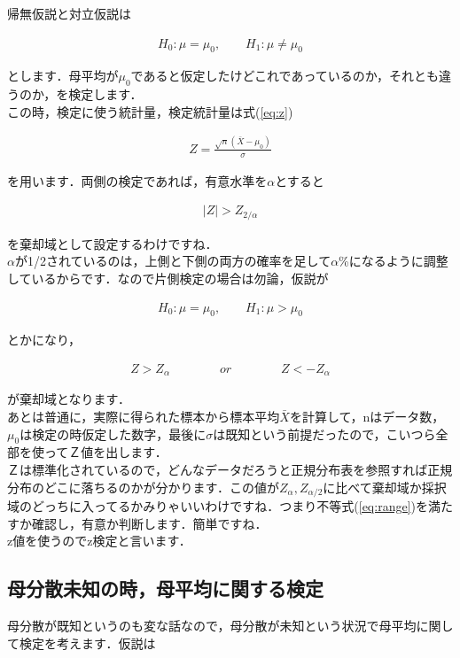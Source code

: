 \documentclass[11pt,a4paper]{ujreport} 	%
\begin{document}
帰無仮説と対立仮説は

\begin{align}
  H_0 : \mu = \mu_0, \qquad H_1 : \mu \neq \mu_0
\end{align}

とします．母平均が$\mu_0$であると仮定したけどこれであっているのか，それとも違うのか，を検定します．\\

この時，検定に使う統計量，検定統計量は式(\ref{eq:z})

\begin{align}
  Z = \frac{\sqrt{n}(\bar{X}-\mu_0)}{\sigma}
\end{align}

を用います．両側の検定であれば，有意水準を$\alpha$とすると

\begin{align}
  |Z| > Z_{2/\alpha}
  \label{eq:range}
\end{align}

を棄却域として設定するわけですね．\\

$\alpha$が1/2されているのは，上側と下側の両方の確率を足して$\alpha$\%になるように調整しているからです．なので片側検定の場合は勿論，仮説が

\begin{align}
  H_0 : \mu = \mu_0, \qquad H_1 : \mu > \mu_0
\end{align}

とかになり，

\begin{align}
  Z > Z_\alpha \qquad \qquad or \qquad \qquad Z < - Z_\alpha
\end{align}

が棄却域となります．\\

あとは普通に，実際に得られた標本から標本平均$\bar{X}$を計算して，nはデータ数，$\mu_0$は検定の時仮定した数字，最後に$\sigma$は既知という前提だったので，こいつら全部を使ってＺ値を出します．\\

Ｚは標準化されているので，どんなデータだろうと正規分布表を参照すれば正規分布のどこに落ちるのかが分かります．この値が$Z_{\alpha}, Z_{\alpha/2}$に比べて棄却域か採択域のどっちに入ってるかみりゃいいわけですね．つまり不等式(\ref{eq:range})を満たすか確認し，有意か判断します．簡単ですね．\\

z値を使うのでz検定と言います．

\subsection{母分散未知の時，母平均に関する検定}
母分散が既知というのも変な話なので，母分散が未知という状況で母平均に関して検定を考えます．仮説は
\end{document}
